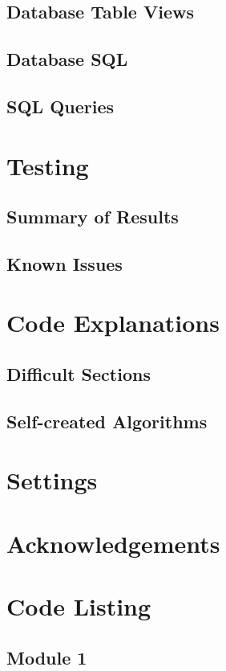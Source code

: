 \subsection{Database Table Views}

\subsection{Database SQL}

\subsection{SQL Queries}

\section{Testing}

\subsection{Summary of Results}

\subsection{Known Issues}

\section{Code Explanations}

\subsection{Difficult Sections}

\subsection{Self-created Algorithms}

\section{Settings}

\section{Acknowledgements}

\section{Code Listing}
\begin{landscape}
\subsection{Module 1}

\end{landscape}
